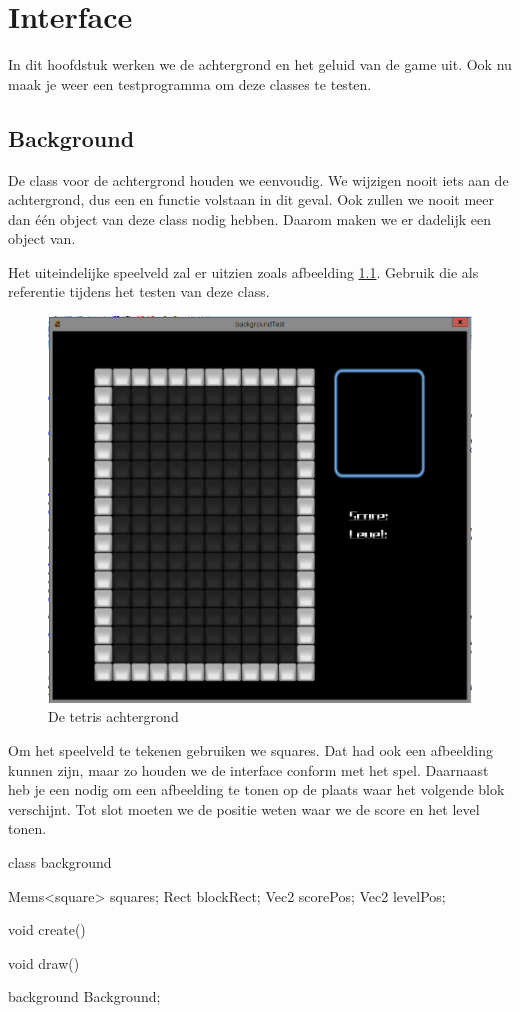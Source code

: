 \chapter{Interface}

In dit hoofdstuk werken we de achtergrond en het geluid van de game uit. Ook nu maak je weer een testprogramma om deze classes te testen.

\section{Background}
De class voor de achtergrond houden we eenvoudig. We wijzigen nooit iets aan de achtergrond, dus een  en  functie volstaan in dit geval. Ook zullen we nooit meer dan \'e\'en object van deze class nodig hebben. Daarom maken we er dadelijk een object van.

Het uiteindelijke speelveld zal er uitzien zoals afbeelding \ref{fig:tetris_background}. Gebruik die als referentie tijdens het testen van deze class.

\begin{figure}[ht]
\centering
\includegraphics[width=0.6\linewidth]{../images/tetris_background}
\caption[]{De tetris achtergrond}
\label{fig:tetris_background}
\end{figure}

Om het speelveld te tekenen gebruiken we squares. Dat had ook een afbeelding kunnen zijn, maar zo houden we de interface conform met het spel. Daarnaast heb je een  nodig om een afbeelding te tonen op de plaats waar het volgende blok verschijnt. Tot slot moeten we de positie weten waar we de score en het level tonen.

\begin{code}
class background
{
   Mems<square> squares;
   Rect blockRect;
   Vec2 scorePos;
   Vec2 levelPos;
   
   void create()
   {
   }
   
   void draw()
   {
   }
}

background Background;
\end{code}

